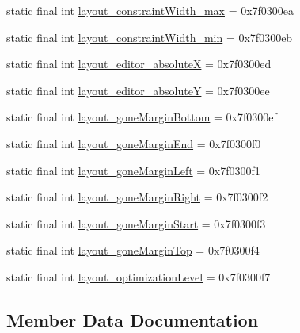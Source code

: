 \begin{DoxyCompactItemize}
\item 
static final int \mbox{\hyperlink{classandroid_1_1support_1_1constraint_1_1R_1_1attr_a8ff245be4c36f0690b7853d834fef594}{layout\+\_\+constraint\+Width\+\_\+max}} = 0x7f0300ea
\item 
static final int \mbox{\hyperlink{classandroid_1_1support_1_1constraint_1_1R_1_1attr_a5a49ae2c12f8ebb4a81668e22b8235e6}{layout\+\_\+constraint\+Width\+\_\+min}} = 0x7f0300eb
\item 
static final int \mbox{\hyperlink{classandroid_1_1support_1_1constraint_1_1R_1_1attr_aecc960b1c8892a8b2c19ddb7d00f262d}{layout\+\_\+editor\+\_\+absoluteX}} = 0x7f0300ed
\item 
static final int \mbox{\hyperlink{classandroid_1_1support_1_1constraint_1_1R_1_1attr_aac2297ccf772fd1991195749704e4337}{layout\+\_\+editor\+\_\+absoluteY}} = 0x7f0300ee
\item 
static final int \mbox{\hyperlink{classandroid_1_1support_1_1constraint_1_1R_1_1attr_a2128b9a34152b6fc809a6e98756aa42f}{layout\+\_\+gone\+Margin\+Bottom}} = 0x7f0300ef
\item 
static final int \mbox{\hyperlink{classandroid_1_1support_1_1constraint_1_1R_1_1attr_acf5bd3ce26104fd5dfb21dad85209190}{layout\+\_\+gone\+Margin\+End}} = 0x7f0300f0
\item 
static final int \mbox{\hyperlink{classandroid_1_1support_1_1constraint_1_1R_1_1attr_a543e9fcd439ae384cc82f0f49b6fef9c}{layout\+\_\+gone\+Margin\+Left}} = 0x7f0300f1
\item 
static final int \mbox{\hyperlink{classandroid_1_1support_1_1constraint_1_1R_1_1attr_ab245b747bb3e00d536dd43ad6a0e8df8}{layout\+\_\+gone\+Margin\+Right}} = 0x7f0300f2
\item 
static final int \mbox{\hyperlink{classandroid_1_1support_1_1constraint_1_1R_1_1attr_a2cd31cc38cd7d52e34e96ab00ab2d85e}{layout\+\_\+gone\+Margin\+Start}} = 0x7f0300f3
\item 
static final int \mbox{\hyperlink{classandroid_1_1support_1_1constraint_1_1R_1_1attr_a305701c04de581e4593ac38844061adc}{layout\+\_\+gone\+Margin\+Top}} = 0x7f0300f4
\item 
static final int \mbox{\hyperlink{classandroid_1_1support_1_1constraint_1_1R_1_1attr_a54cee958221f1d1e32255db5fa73d364}{layout\+\_\+optimization\+Level}} = 0x7f0300f7
\end{DoxyCompactItemize}


\subsection{Member Data Documentation}
\mbox{\label{classandroid_1_1support_1_1constraint_1_1R_1_1attr_ae52cf5695204b7da3ea816100b4244e5}} 
